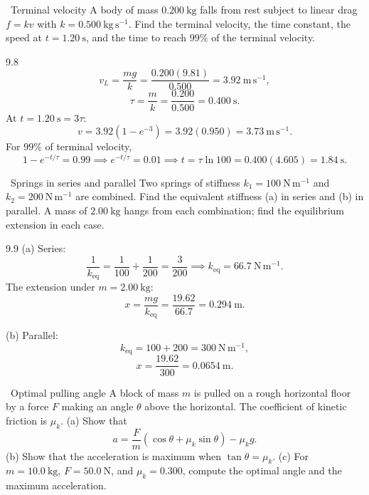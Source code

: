 \begin{exercise}{\core\ Terminal velocity}
A body of mass $0.200\ \mathrm{kg}$ falls from rest subject to linear drag
$f=kv$ with $k=0.500\ \mathrm{kg\,s^{-1}}$. Find the terminal velocity, the time
constant, the speed at $t=1.20\ \mathrm{s}$, and the time to reach $99\%$ of the
terminal velocity.
\end{exercise}

\begin{tabletworkspace}[6.5cm]
\end{tabletworkspace}

\begin{solution}{9.8}
\[
v_L=\frac{mg}{k}=\frac{0.200(9.81)}{0.500}=3.92\ \mathrm{m\,s^{-1}},
\]
\[
\tau=\frac mk=\frac{0.200}{0.500}=0.400\ \mathrm{s}.
\]
At $t=1.20\ \mathrm{s}=3\tau$:
\[
v=3.92\left(1-e^{-3}\right)=3.92(0.950)=3.73\ \mathrm{m\,s^{-1}}.
\]
For $99\%$ of terminal velocity,
\[
1-e^{-t/\tau}=0.99
\implies
e^{-t/\tau}=0.01
\implies
t=\tau\ln100=0.400(4.605)=1.84\ \mathrm{s}.
\]
\end{solution}

\begin{exercise}{\mastery\ Springs in series and parallel}
Two springs of stiffness $k_1=100\ \mathrm{N\,m^{-1}}$ and
$k_2=200\ \mathrm{N\,m^{-1}}$ are combined. Find the equivalent stiffness
(a) in series and (b) in parallel. A mass of $2.00\ \mathrm{kg}$ hangs from each
combination; find the equilibrium extension in each case.
\end{exercise}

\begin{tabletworkspace}[6.5cm]
\end{tabletworkspace}

\begin{solution}{9.9}
(a) Series:
\[
\frac1{k_{\mathrm{eq}}}=\frac1{100}+\frac1{200}
=\frac{3}{200}
\implies
k_{\mathrm{eq}}=66.7\ \mathrm{N\,m^{-1}}.
\]
The extension under $m=2.00\ \mathrm{kg}$:
\[
x=\frac{mg}{k_{\mathrm{eq}}}=\frac{19.62}{66.7}=0.294\ \mathrm{m}.
\]

(b) Parallel:
\[
k_{\mathrm{eq}}=100+200=300\ \mathrm{N\,m^{-1}},
\]
\[
x=\frac{19.62}{300}=0.0654\ \mathrm{m}.
\]
\end{solution}

\begin{exercise}{\mastery\ Optimal pulling angle}
A block of mass $m$ is pulled on a rough horizontal floor by a force $F$ making
an angle $\theta$ above the horizontal. The coefficient of kinetic friction is
$\mu_k$.
(a) Show that
\[
a=\frac Fm(\cos\theta+\mu_k\sin\theta)-\mu_kg.
\]
(b) Show that the acceleration is maximum when $\tan\theta=\mu_k$.
(c) For $m=10.0\ \mathrm{kg}$, $F=50.0\ \mathrm{N}$, and $\mu_k=0.300$, compute
the optimal angle and the maximum acceleration.
\end{exercise}

